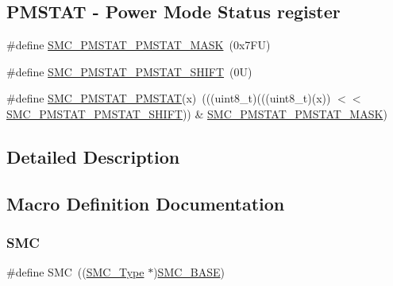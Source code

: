 \subsection*{P\+M\+S\+T\+AT -\/ Power Mode Status register}
\begin{DoxyCompactItemize}
\item 
\#define \mbox{\hyperlink{group___s_m_c___register___masks_ga2574f973caed7a43c1d0b69888866f63}{S\+M\+C\+\_\+\+P\+M\+S\+T\+A\+T\+\_\+\+P\+M\+S\+T\+A\+T\+\_\+\+M\+A\+SK}}~(0x7\+F\+U)
\item 
\#define \mbox{\hyperlink{group___s_m_c___register___masks_gaa4083ab43677e6a1b6832f6607a5ef0e}{S\+M\+C\+\_\+\+P\+M\+S\+T\+A\+T\+\_\+\+P\+M\+S\+T\+A\+T\+\_\+\+S\+H\+I\+FT}}~(0\+U)
\item 
\#define \mbox{\hyperlink{group___s_m_c___register___masks_ga27d1d3c05772950ce55e5ad4d2a998e3}{S\+M\+C\+\_\+\+P\+M\+S\+T\+A\+T\+\_\+\+P\+M\+S\+T\+AT}}(x)~(((uint8\+\_\+t)(((uint8\+\_\+t)(x)) $<$$<$ \mbox{\hyperlink{group___s_m_c___register___masks_gaa4083ab43677e6a1b6832f6607a5ef0e}{S\+M\+C\+\_\+\+P\+M\+S\+T\+A\+T\+\_\+\+P\+M\+S\+T\+A\+T\+\_\+\+S\+H\+I\+FT}})) \& \mbox{\hyperlink{group___s_m_c___register___masks_ga2574f973caed7a43c1d0b69888866f63}{S\+M\+C\+\_\+\+P\+M\+S\+T\+A\+T\+\_\+\+P\+M\+S\+T\+A\+T\+\_\+\+M\+A\+SK}})
\end{DoxyCompactItemize}


\subsection{Detailed Description}


\subsection{Macro Definition Documentation}
\mbox{\label{group___s_m_c___register___masks_ga6667e81e5b32250febd3d46511d9309d}} 
\subsubsection{\texorpdfstring{S\+MC}{SMC}}
{\footnotesize\ttfamily \#define S\+MC~((\mbox{\hyperlink{struct_s_m_c___type}{S\+M\+C\+\_\+\+Type}} $\ast$)\mbox{\hyperlink{group___s_m_c___register___masks_ga683c9b3b5d9d94fb1ac7c4c18f5aff44}{S\+M\+C\+\_\+\+B\+A\+SE}})}

